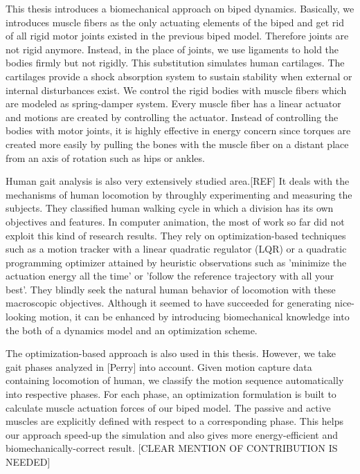 \documentclass[a4paper,10pt]{article}
\begin{document}
This thesis introduces a biomechanical approach on biped dynamics. Basically,
we introduces muscle fibers as the only actuating elements
of the biped and get rid of all rigid motor joints existed in the previous biped
model. Therefore joints are not rigid anymore. Instead, in the place of joints,
we use ligaments to hold the bodies firmly but not rigidly. This substitution
simulates human cartilages. The cartilages provide a shock absorption
system to sustain stability when external or internal disturbances exist.
We control the rigid bodies with muscle fibers which are modeled as
spring-damper system. Every muscle fiber has a linear actuator and
motions are created by controlling the actuator. Instead of controlling
the bodies with motor joints, it is highly effective in energy concern
since torques are created more easily by pulling the bones with the muscle fiber on a distant place from an axis of rotation such as hips or ankles.

Human gait analysis is also very extensively studied area.[REF] It deals
with the mechanisms of human locomotion by throughly experimenting and measuring
the subjects. They classified human walking cycle in which a division
has its own objectives and features.
In computer animation, the most of work so far did not
exploit this kind of research results. They rely on optimization-based
techniques such as a motion tracker with a linear quadratic regulator (LQR)
or a quadratic programming optimizer attained by heuristic observations
such as 'minimize the actuation energy all the time' or 'follow the
reference trajectory with all your best'. They blindly seek the
natural human behavior of locomotion with these macroscopic objectives.
Although it seemed to have succeeded for generating nice-looking motion,
it can be enhanced by introducing biomechanical knowledge into the both of
a dynamics model and an optimization scheme.

The optimization-based approach is also used in this thesis. However,
we take gait phases analyzed in [Perry] into account. Given motion
capture data containing locomotion of human, we classify the motion
sequence automatically into respective phases. For each phase,
an optimization formulation is built to calculate muscle actuation forces
of our biped model. The passive and active muscles are explicitly defined
with respect to a corresponding phase.
This helps our approach speed-up the simulation
and also gives more energy-efficient and biomechanically-correct result.
[CLEAR MENTION OF CONTRIBUTION IS NEEDED]
\end{document}
